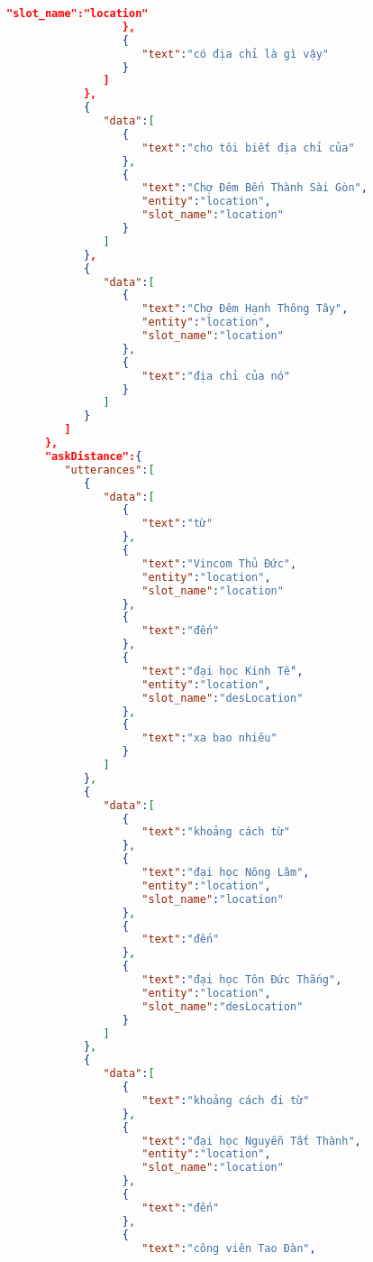 \begin{lstlisting}[language=json,firstnumber=1]
                     "slot_name":"location"
                  },
                  {
                     "text":"có địa chỉ là gì vậy"
                  }
               ]
            },
            {
               "data":[
                  {
                     "text":"cho tôi biết địa chỉ của"
                  },
                  {
                     "text":"Chợ Đêm Bến Thành Sài Gòn",
                     "entity":"location",
                     "slot_name":"location"
                  }
               ]
            },
            {
               "data":[
                  {
                     "text":"Chợ Đêm Hạnh Thông Tây",
                     "entity":"location",
                     "slot_name":"location"
                  },
                  {
                     "text":"địa chỉ của nó"
                  }
               ]
            }
         ]
      },
      "askDistance":{
         "utterances":[
            {
               "data":[
                  {
                     "text":"từ"
                  },
                  {
                     "text":"Vincom Thủ Đức",
                     "entity":"location",
                     "slot_name":"location"
                  },
                  {
                     "text":"đến"
                  },
                  {
                     "text":"đại học Kinh Tế",
                     "entity":"location",
                     "slot_name":"desLocation"
                  },
                  {
                     "text":"xa bao nhiêu"
                  }
               ]
            },
            {
               "data":[
                  {
                     "text":"khoảng cách từ"
                  },
                  {
                     "text":"đại học Nông Lâm",
                     "entity":"location",
                     "slot_name":"location"
                  },
                  {
                     "text":"đến"
                  },
                  {
                     "text":"đại học Tôn Đức Thắng",
                     "entity":"location",
                     "slot_name":"desLocation"
                  }
               ]
            },
            {
               "data":[
                  {
                     "text":"khoảng cách đi từ"
                  },
                  {
                     "text":"đại học Nguyễn Tất Thành",
                     "entity":"location",
                     "slot_name":"location"
                  },
                  {
                     "text":"đến"
                  },
                  {
                     "text":"công viên Tao Đàn",

\end{lstlisting}
